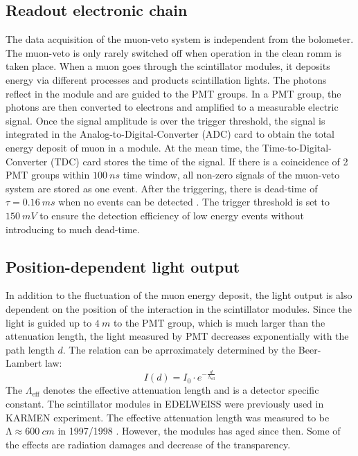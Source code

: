 \subsection{Readout electronic chain}
The data acquisition of the muon-veto system is independent from the bolometer. The muon-veto is only rarely switched off when operation in the clean romm is taken place.
When a muon goes through the scintillator modules, it deposits energy via different processes and products scintillation lights. The photons reflect in the module and are guided to the PMT groups. In a PMT group, the photons are then converted to electrons and amplified to a measurable electric signal. Once the signal amplitude is over the trigger threshold, the signal is integrated in the Analog-to-Digital-Converter (ADC) card to obtain the total energy deposit of muon in a module. At the mean time, the Time-to-Digital-Converter (TDC) card stores the time of the signal. If there is a coincidence of 2 PMT groups within $\SI{100}{ns}$ time window, all non-zero signals of the muon-veto system are stored as one event. After the triggering, there is dead-time of $\tau=\SI{0.16}{ms}$ when no events can be detected \cite{Sch13b}. The trigger threshold is set to $\SI{150}{mV}$ to ensure the detection efficiency of low energy events without introducing to much dead-time.

\subsection{Position-dependent light output}
In addition to the fluctuation of the muon energy deposit, the light output is also dependent on the position of the interaction in the scintillator modules. Since the light is guided up to $\SI{4}{m}$ to the PMT group, which is much larger than the attenuation length, the light measured by PMT decreases exponentially with the path length $d$. The relation can be aprroximately determined by the Beer-Lambert law:
\begin{equation}
  I(d)=I_{0}\cdot e^{-\frac{d}{\mathrm{\Lambda}_{\mathrm{eff}}}}
\end{equation}
The $\Lambda_{\mathrm{eff}}$ denotes the effective attenuation length and is a detector specific constant.
The scintillator modules in EDELWEISS were previously used in KARMEN experiment. The effective attenuation length was measured to be $\mathrm{\Lambda} \approx \SI{600}{cm}$ in 1997/1998 \cite{Rei98}. However, the modules has aged since then. Some of the effects are radiation damages and decrease of the transparency.

